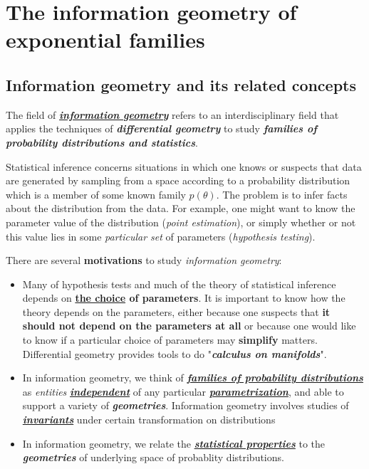 \documentclass[11pt]{article}
\begin{document}
\newpage
\section{The information geometry of exponential families}
\subsection{Information geometry and its related concepts}
The field of \underline{\emph{\textbf{information geometry}}} \citep{murray1993differential, amari2007methods} refers to an interdisciplinary field that applies the techniques of \emph{\textbf{differential geometry}} \citep{do1976differential, do1992riemannian, lee2003introduction} to study   \emph{\textbf{families of probability distributions and statistics}}.

Statistical inference concerns situations in which one knows or suspects that data are generated by sampling from a space according to a probability distribution which is a member of some known family $p(\theta)$.  The problem is to infer facts about the distribution from the data. For example, one might want to know the parameter value of the distribution (\emph{point estimation}), or simply whether or not this value lies in some \emph{particular set} of parameters (\emph{hypothesis testing}). 

There are several \textbf{motivations} to study \emph{information geometry}:
\begin{itemize}
\item Many of hypothesis tests and much of the theory of statistical inference depends on \textbf{\underline{the choice} of parameters}. It is important to know how the theory depends on the parameters, either because one suspects that \textbf{it should not depend on the parameters at all} or because one would like to know if a particular choice of parameters may \textbf{simplify} matters. Differential geometry provides tools to do "\emph{\textbf{calculus on manifolds}}".

\item In information geometry, we think of \underline{\textbf{\emph{families of probability distributions}}} as \emph{entities} \underline{\emph{\textbf{independent}}} of any particular \underline{\emph{\textbf{parametrization}}}, and able to  support a variety of \emph{\textbf{geometries}}. Information geometry involves studies of \underline{\emph{\textbf{invariants}}} under certain transformation on distributions

\item In information geometry, we relate the \underline{\emph{\textbf{statistical properties}}} to the  \emph{\textbf{geometries}} of underlying space of probablity distributions.
\end{itemize}
\end{document}
